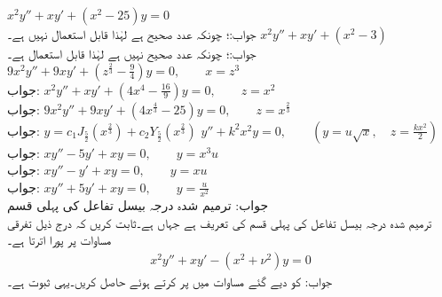\quad
$x^2y''+xy'+(x^2-25)y=0$\\
جواب:؛ چونکہ  عدد صحیح ہے لہٰذا  قابل استعمال نہیں ہے۔
\quad
$x^2y''+xy'+(x^2-3)$\\
جواب:؛ چونکہ  عدد صحیح نہیں ہے لہٰذا  قابل استعمال ہے۔
\quad
$9x^2y''+9xy'+(z^{\tfrac{2}{3}}-\tfrac{9}{4})y=0, \quad \quad x=z^3$\\
جواب:
\quad
$x^2y''+xy'+(4x^4-\tfrac{16}{9})y=0,\quad \quad z=x^2$\\
جواب:
\quad
$9x^2y''+9xy'+(4x^{\tfrac{4}{3}}-25)y=0,\quad \quad z=x^{\tfrac{2}{3}}$\\
جواب:
$y=c_1J_{\tfrac{5}{2}}(x^{\tfrac{2}{3}})+c_2Y_{\tfrac{5}{2}}(x^{\tfrac{2}{3}})$
\quad
$y''+k^2x^2y=0,\quad \quad (y=u\sqrt{x},\quad z=\tfrac{kx^2}{2})$\\
جواب:
\quad
$xy''-5y'+xy=0,\quad \quad y=x^3u$\\
جواب:
\quad
$xy''-y'+xy=0,\quad \quad y=xu$\\
جواب:
\quad
$xy''+5y'+xy=0,\quad \quad y=\tfrac{u}{x^2}$\\
جواب:
\quad ترمیم شدہ درجہ  بیسل تفاعل کی پہلی قسم\\
ترمیم شدہ درجہ  بیسل تفاعل کی پہلی قسم کی تعریف  ہے جہاں  ہے۔ثابت کریں  کہ  درج ذیل تفرقی مساوات پر پورا اترتا ہے۔
\begin{align}\label{مساوت_بیسل_ترمیم_شدہ}
x^2y''+xy'-(x^2+\nu^2)y=0
\end{align}
جواب: کو دیے گئے مساوات میں پر کرتے ہوئے  حاصل کریں۔یہی ثبوت ہے۔
